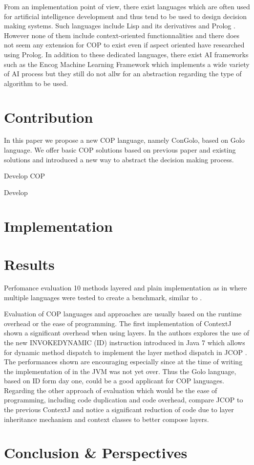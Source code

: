 \documentclass[a4paper]{article}
\begin{document}
From an implementation point of view, there exist languages which are often used for artificial intelligence development and thus tend to be used to design decision making systems. Such languages include Lisp and its derivatives and Prolog \cite{lohmann_aspect-oriented_2008}. However none of them include context-oriented functionnalities and there does not seem any extension for COP to exist even if aspect oriented have researched using Prolog. In addition to these dedicated languages, there exist AI frameworks such as the Encog Machine Learning Framework which implements a wide variety of AI process but they still do not allw for an abstraction regarding the type of algorithm to be used.

 
\section{Contribution}
\label{section:contribution}

In this paper we propose a new COP language, namely ConGolo, based on Golo language. We offer basic COP solutions based on previous paper and existing solutions and introduced a new way to abstract the decision making process.

Develop COP

Develop 


\section{Implementation}
\label{section:implementation}

\section{Results}
\label{section:results}

Perfomance evaluation
10 methods layered and plain implementation as in \cite{appeltauer_comparison_2009} where multiple languages were tested to create a benchmark, similar to \cite{kamina_eventcj:_2011}.

Evaluation of COP languages and approaches are usually based on the runtime overhead or the ease of programming. The first implementation of ContextJ \cite{haupt_contextj:_2011} shown a significant overhead when using layers. In \cite{appeltauer_layered_2010} the authors explores the use of the new INVOKEDYNAMIC (ID) instruction introduced in Java 7 which allows for dynamic method dispatch to implement the layer method dispatch in JCOP \cite{appeltauer_declarative_2013}. The performances shown are encouraging especially since at the time of writing the implementation of in the JVM was not yet over. Thus the Golo language, based on ID form day one, could be a good applicant for COP languages. Regarding the other approach of evaluation which would be the ease of programming, including code duplication and code overhead, \cite{appeltauer_declarative_2013} compare JCOP to the previous ContextJ and notice a significant reduction of code due to layer inheritance mechanism and context classes to better compose layers.

\section{Conclusion \& Perspectives}
\label{section:conclusion}


%
%



\end{document}
